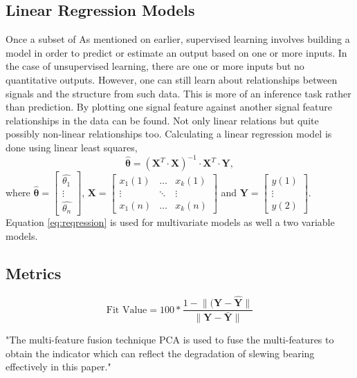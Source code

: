 \documentclass[]{article}
\begin{document}
\subsection{Linear Regression Models}
Once a subset of
As mentioned on earlier, supervised learning involves building a model in order to predict or estimate an output based on one or more inputs. In the case of unsupervised learning, there are one or more inputs but no quantitative outputs. However, one can still learn about relationships between signals and the structure from such data. This is more of an inference task rather than prediction.
By plotting one signal feature against another signal feature relationships in the data can be found. Not only linear relations but quite possibly non-linear relationships too.
Calculating a linear regression model is done using linear least squares, 
\begin{equation} \label{eq:reqression}
	\hat{\boldsymbol{\theta}} = (\mathbf{X}^T \cdot \mathbf{X})^{-1} \cdot \mathbf{X}^T \cdot \mathbf{Y},
\end{equation}
where $ \hat{\boldsymbol{\theta}} = \begin{bmatrix} \hat{\theta_{1}} \\ \vdots \\ \hat{\theta_{n}} \end{bmatrix} $, $ \mathbf{X} = \begin{bmatrix} x_{1}(1) & \hdots & x_{k}(1) \\ \vdots & \ddots & \vdots \\ x_{1}(n) & \hdots & x_{k}(n)  \end{bmatrix}$ and 
$ \mathbf{Y} = \begin{bmatrix} y(1) \\ \vdots \\ y(2)\end{bmatrix}$.\\
Equation \ref{eq:reqression} is used for multivariate models as well a two variable models.
\subsection{Metrics}
\begin{equation}
	\textrm{Fit Value} = 100 * \frac{ 1 - \lVert(\mathbf{Y} - \mathbf{\hat{Y}}\rVert } { \lVert \mathbf{Y} - \mathbf{\bar{Y}} \rVert }
\end{equation}

"The multi-feature fusion technique PCA is used to fuse the multi-features to obtain the indicator which can reflect the degradation of slewing bearing effectively in this paper."~\cite{lu2016degradation}
\end{document}
